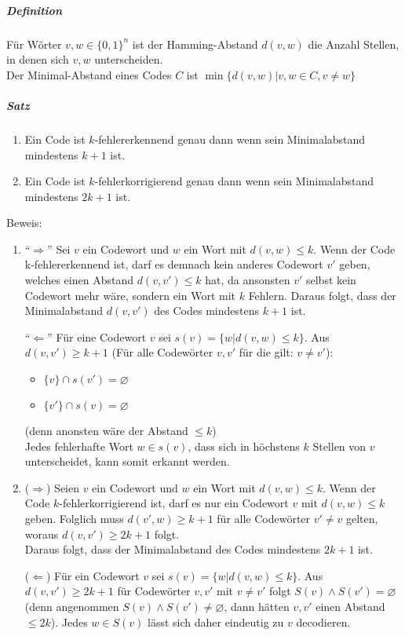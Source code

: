 \documentclass[a4paper]{scrartcl}
\begin{document}
\subparagraph{Definition}
Für Wörter $v,w \in \{ 0,1\}^n$ ist der Hamming-Abstand $d(v,w)$ die Anzahl Stellen, in denen sich $v,w$ unterscheiden.\\
Der Minimal-Abstand eines Codes $C$ ist $\min{\{d(v,w)|v,w\in C, v \neq w \}}$

\subparagraph{Satz}
\begin{enumerate}
\item Ein Code ist $k$-fehlererkennend genau dann wenn sein Minimalabstand mindestens $k+1$ ist.
\item Ein Code ist $k$-fehlerkorrigierend genau dann wenn sein Minimalabstand mindestens $2 k +1$ ist.
\end{enumerate}

Beweis:
\begin{enumerate}
\item "`$\Rightarrow$"' Sei $v$ ein Codewort und $w$ ein Wort mit $d(v,w) \leq k $. Wenn der Code k-fehlererkennend ist, darf es demnach kein anderes Codewort $v'$ geben, welches einen Abstand $d(v,v') \leq k$ hat, da ansonsten $v'$ selbst kein Codewort mehr wäre, sondern ein Wort mit $k$ Fehlern. Daraus folgt, dass der Minimalabstand $d(v,v')$ des Codes mindestens $k+1$ ist.

"`$\Leftarrow$"' Für eine Codewort $v$ sei $s(v) = \{w | d(v,w) \leq k\}$. Aus $d(v,v') \geq k+1$ (Für alle Codewörter $v,v'$ für die gilt: $v \neq v'$):
\begin{itemize}
\item $\{v\} \cap s (v') = \varnothing$
\item $\{v'\} \cap s(v) = \varnothing$
\end{itemize}
(denn anonsten wäre der Abstand $\leq k$)\\
Jedes fehlerhafte Wort $w \in s(v)$, dass sich in höchstens $k$ Stellen von $v$ unterscheidet, kann somit erkannt werden.
\item ($\Rightarrow$) Seien $v$ ein Codewort und $w$ ein Wort mit $d(v,w) \leq k$. Wenn der Code $k$-fehlerkorrigierend ist, darf es nur ein Codewort $v$ mit $d(v,w) \leq k$ geben. Folglich muss $d(v',w) \geq k +1$ für alle Codewörter $v' \neq v$ gelten, woraus $d(v,v') \geq 2k +1$ folgt.\\
Daraus folgt, dass der Minimalabstand des Codes mindestens $2k+1$ ist.

($\Leftarrow$) Für ein Codewort $v$ sei $s(v) = \{ w | d(v,w) \leq k \}$. Aus $d(v,v') \geq 2k +1$ für Codewörter $v,v'$ mit $v \neq v'$ folgt $S(v) \wedge S(v') = \varnothing$ (denn angenommen $S(v) \wedge S(v') \neq \varnothing$, dann hätten $v,v'$ einen Abstand $\leq 2k$). Jedes $w \in S(v)$ lässt sich daher eindeutig zu $v$ decodieren.
\end{enumerate}
\end{document}
